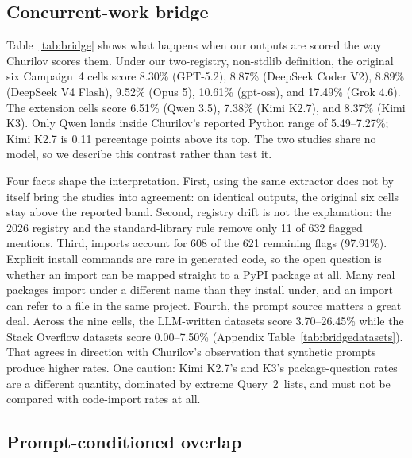 \documentclass[10pt,twocolumn,letterpaper]{article}
\newcommand{\qtwo}{Query~2}
\begin{document}


\subsection{Concurrent-work bridge}
\label{sec:bridge}

Table~\ref{tab:bridge} shows what happens when our outputs are scored the way Churilov scores them.
Under our two-registry, non-stdlib definition, the original six Campaign~4 cells score 8.30\%
(GPT-5.2), 8.87\% (DeepSeek Coder V2), 8.89\% (DeepSeek V4 Flash), 9.52\% (Opus 5), 10.61\% (gpt-oss),
and 17.49\% (Grok 4.6). The extension cells score 6.51\% (Qwen 3.5), 7.38\% (Kimi K2.7), and 8.37\%
(Kimi K3). Only Qwen lands inside Churilov's reported Python range of 5.49--7.27\%; Kimi K2.7 is 0.11
percentage points above its top. The two studies share no model, so we describe this contrast rather
than test it.



Four facts shape the interpretation. First, using the same extractor does not by itself bring the
studies into agreement: on identical outputs, the original six cells stay above the reported band.
Second, registry drift is not the explanation: the 2026 registry and the standard-library rule remove
only 11 of 632 flagged mentions. Third, imports account for 608 of the 621 remaining flags (97.91\%).
Explicit install commands are rare in generated code, so the open question is whether an import can
be mapped straight to a PyPI package at all. Many real packages import under a different name than
they install under, and an import can refer to a file in the same project. Fourth, the prompt source
matters a great deal. Across the nine cells, the LLM-written datasets score 3.70--26.45\% while the
Stack Overflow datasets score 0.00--7.50\% (Appendix Table~\ref{tab:bridgedatasets}). That agrees in
direction with Churilov's observation that synthetic prompts produce higher rates. One caution: Kimi
K2.7's and K3's package-question rates are a different quantity, dominated by extreme \qtwo\ lists,
and must not be compared with code-import rates at all.

\subsection{Prompt-conditioned overlap}
\label{sec:overlap}
\end{document}
